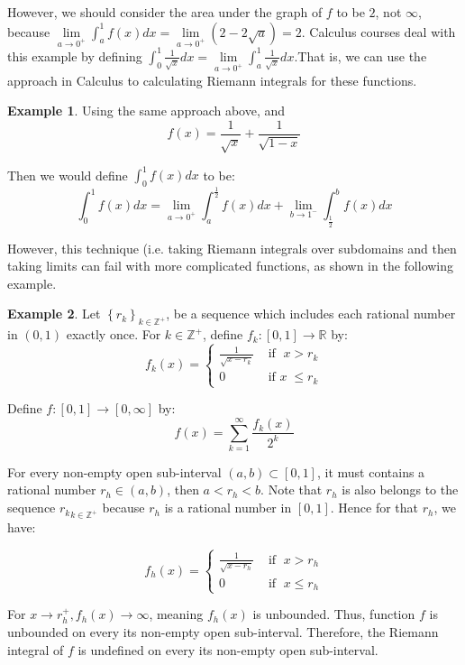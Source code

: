 \documentclass[reqno]{amsart}
\theoremstyle{definition}
\newtheorem{example}{Example}
\begin{document}
However, we should consider the area under the graph of $f$ to be $2$, not $\infty$, because $\lim\limits_{a\rightarrow0^{+}}\int^{1}_{a}f(x) dx = \lim\limits_{a\rightarrow 0^{+}}(2-2\sqrt{a}) = 2$. Calculus courses deal with this example by defining $\int^{1}_{0}\frac{1}{\sqrt{x}} dx = \lim\limits_{a\rightarrow 0^{+}}\int^{1}_{a}\frac{1}{\sqrt{x}}dx$.That is, we can use the approach in Calculus to calculating Riemann integrals for these functions. 

\begin{example}
Using the same approach above, and
$$
f(x) = \frac{1}{\sqrt{x}} + \frac{1}{\sqrt{1-x}}
$$

Then we would define $\int^{1}_{0} f(x) dx$ to be:\
$$
\int^{1}_{0} f(x) dx = \lim\limits_{a\rightarrow 0^{+}}\int^{\frac{1}{2}}_{a} f(x) dx + \lim\limits_{b\rightarrow 1^{-}}\int^{b}_{\frac{1}{2}} f(x) dx
$$ 

However, this technique (i.e. taking Riemann integrals over subdomains and then taking limits can fail with more complicated functions, as shown in the following example.
\end{example}

\begin{example}
Let $\left\{r_{k}\right\}_{k \in \mathbb{Z}^{+}}$, be a sequence which includes each rational number in $(0, 1)$ exactly once. For $k \in \mathbb{Z}^{+}$, define $f_{k}: [0, 1] \rightarrow \mathbb{R}$ by:
$$
f_{k}(x) = 
\begin{cases}
\frac{1}{\sqrt{x-r_{k}}} & \mbox{ if } \; x > r_{k}\\
0 & \mbox{ if } x \; \leq r_{k}
\end{cases}
$$

Define $f: [0, 1] \rightarrow [0, \infty]$ by:
$$
f(x) = \sum\limits^{\infty}_{k=1}\frac{f_{k}(x)}{2^{k}}
$$
\end{example}

For every non-empty open sub-interval $(a, b) \subset [0, 1]$, it must contains a rational number $r_{h} \in (a, b)$, then $a < r_{h} < b$. Note that $r_{h}$ is also belongs to the sequence ${r_{k}}_{k \in \mathbb{Z}^{+}}$ because $r_{h}$ is a rational number in $[0, 1]$. Hence for that $r_{h}$, we have:

$$
f_{h}(x) =
\begin{cases}
\frac{1}{\sqrt{x-r_{h}}} & \mbox{ if } \; x > r_{h}\\
0 & \mbox{ if } \; x \leq r_{h}
\end{cases}
$$

For $x\rightarrow r^{+}_{h}, f_{h}(x)\rightarrow \infty$, meaning $f_{h}(x)$ is unbounded. Thus, function $f$ is unbounded on every its non-empty open sub-interval. Therefore, the Riemann integral of $f$ is undefined on every its non-empty open sub-interval.
\end{document}
